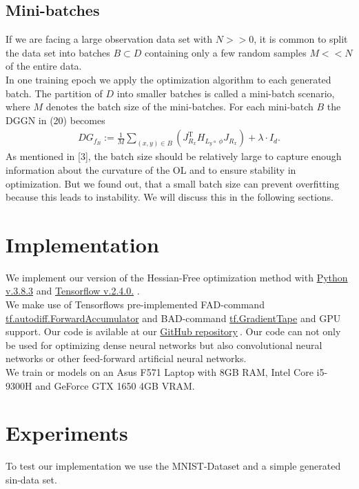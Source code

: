 \documentclass[conference]{IEEEtran}
\begin{document}
	\subsection{Mini-batches}
	\noindent
	If we are facing a large observation data set with $N>>0$, it is common to split the data set into batches $B\subset D$ containing only a few random samples $M<<N$ of the entire data. \\
	In one training epoch we apply the optimization algorithm to each generated batch. The partition of $D$ into smaller batches is called a mini-batch scenario, where $M$ denotes the batch size of the mini-batches. For each mini-batch $B$ the DGGN in (20) becomes
	\begin{align}
	DG_{f_{B}} := \frac{1}{M}\sum_{(x, y)\in B}^{}\left(J_{R_{x}}^{\mathrm{T}}H_{L_{y}\circ\:\phi}J_{R_{x}}\right) + \lambda\cdot I_{d}.
	\end{align}
	As mentioned in [3], the batch size should be relatively large to capture enough information about the curvature of the OL and to ensure stability in optimization. But we found out, that a small batch size can prevent overfitting because this leads to instability. We will discuss this in the following sections.



	\section {Implementation}
	\noindent
	We implement our version of the Hessian-Free optimization method with \href{https://www.python.org/}{Python v.3.8.3} and \href{https://www.tensorflow.org/}{Tensorflow v.2.4.0.} .
	\\We make use of Tensorflows pre-implemented FAD-command \href{https://www.tensorflow.org/api_docs/python/tf/autodiff/ForwardAccumulator}{tf.autodiff.ForwardAccumulator} and BAD-command \href{https://www.tensorflow.org/api_docs/python/tf/GradientTape}{tf.GradientTape} and GPU support. Our code is avilable at our \href{https://github.com/NiklasBrunn/Hessian_Free_Optimization_of_Deep_Neural_Networks}{GitHub repository}$\:$. Our code can not only be used for optimizing dense neural networks but also convolutional neural networks or other feed-forward artificial neural networks.
	\\We train or models on an Asus F571 Laptop with 8GB RAM, Intel Core i5-9300H and GeForce GTX 1650 4GB VRAM.


	\section{Experiments}
	\noindent
	To test our implementation we use the MNIST-Dataset and a simple generated sin-data set.
\end{document}
